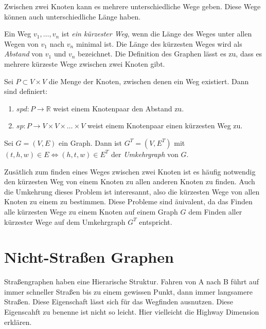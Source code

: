 Zwischen zwei Knoten kann es mehrere unterschiedliche Wege geben.
Diese Wege können auch unterschiedliche Länge haben.

\begin{definition}
    Ein Weg $v_1, \dotsc, v_n$ ist \emph{ein kürzester Weg}, wenn die Länge des Weges unter allen Wegen von $v_1$ nach $v_n$ minimal ist. Die Länge des kürzesten Weges wird als \emph{Abstand} von $v_1$ und $v_n$ bezeichnet. Die Definition des Graphen lässt es zu, dass es mehrere kürzeste Wege zwischen zwei Knoten gibt.

    Sei $P \subset V \times V$ die Menge der Knoten, zwischen denen ein Weg existiert. Dann sind definiert:
    \begin{enumerate}
        \item
              ${spd} \colon P \to \mathbb{R}$ weist einem Knotenpaar den Abstand zu.

        \item
              ${sp} \colon P \to V \times V \times \dots \times V$ weist einem Knotenpaar einen kürzesten Weg zu.
    \end{enumerate}
\end{definition}

\begin{definition}[Umkehrgraph]
    Sei $G = (V, E)$ ein Graph. Dann ist $G^T = (V, E^T)$ mit $(t, h, w) \in E \Leftrightarrow (h, t, w) \in E^T$ der \emph{Umkehrgraph} von $G$.
\end{definition}

Zusätlich zum finden eines Weges zwischen zwei Knoten ist es häufig notwendig den kürzesten Weg von einem Knoten zu allen anderen Knoten zu finden.
Auch die Umkehrung dieses Problem ist interesannt, also die kürzesten Wege von allen Knoten zu einem zu bestimmen.
Diese Probleme sind äuivalent, da das Finden alle kürzesten Wege zu einem Knoten auf einem Graph $G$ dem Finden aller kürzester Wege auf dem Umkehrgraph $G^T$ entspricht.

\section{Nicht-Straßen Graphen}

Straßengraphen haben eine Hierarische Struktur.
Fahren von A nach B führt auf immer schneller Straßen bis zu einem gewissen Punkt, dann immer langsamere Straßen.
Diese Eigenschaft lässt sich für das Wegfinden ausnutzen.
Diese Eigenscahft zu benenne ist nicht so leicht.
Hier vielleicht die Highway Dimension erklären.

